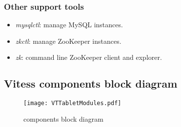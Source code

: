 \subsubsection{Other support tools}\hypertarget{other-support-tools}{}\label{other-support-tools}

\begin{itemize}
\item \emph{mysqlctl}: manage MySQL instances.
\item \emph{zkctl}: manage ZooKeeper instances.
\item \emph{zk}: command line ZooKeeper client and explorer.
\end{itemize}

\subsection{Vitess components block diagram}\hypertarget{vitess-components-block-diagram}{}\label{vitess-components-block-diagram}

\begin{figure}[H]
\caption{components block diagram}
\label{fig:Vitess Spectrum}
\begin{center}
\texttt{[image: VTTabletModules.pdf]}
\end{center}
\end{figure}





